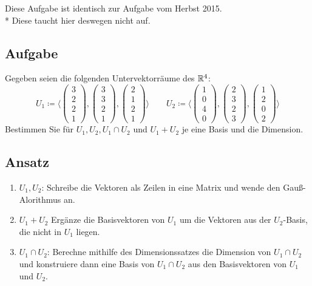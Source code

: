 \begin{remark}
	Diese Aufgabe ist identisch zur Aufgabe vom Herbst 2015. \\*
	Diese taucht hier deswegen nicht auf.
\end{remark}

\subsection{Aufgabe}
Gegeben seien die folgenden Untervektorräume des \( \mathbb{R}^4 \):
\begin{equation*}
	U_1 \coloneqq \langle \begin{pmatrix}
		3 \\ 2 \\ 2 \\ 1
	\end{pmatrix}, \begin{pmatrix}
		3 \\ 3 \\ 2 \\ 1
	\end{pmatrix}, \begin{pmatrix}
		2 \\ 1 \\ 2 \\ 1
	\end{pmatrix} \rangle \qquad U_2 \coloneqq \langle \begin{pmatrix}
		1 \\ 0 \\ 4 \\ 0
	\end{pmatrix}, \begin{pmatrix}
		2 \\ 3 \\ 2 \\ 3
	\end{pmatrix}, \begin{pmatrix}
		1 \\ 2 \\ 0 \\ 2
	\end{pmatrix} \rangle
\end{equation*}
Bestimmen Sie für \( U_1, U_2, U_1 \cap U_2 \) und \( U_1 + U_2 \) je eine Basis und die Dimension.

\subsection{Ansatz}
\begin{enumerate}
	\item \( U_1, U_2 \): Schreibe die Vektoren als Zeilen in eine Matrix und wende den Gauß-Alorithmus an.
	\item \( U_1 + U_2 \) Ergänze die Basisvektoren von \( U_1 \) um die Vektoren aus der \( U_2 \)-Basis, die nicht in \( U_1 \) liegen.
	\item \( U_1 \cap U_2 \): Berechne mithilfe des Dimensionssatzes die Dimension von \( U_1 \cap U_2 \) und konstruiere dann eine Basis von \( U_1 \cap U_2 \) aus den Basisvektoren von \( U_1 \) und \( U_2 \). 
\end{enumerate}

